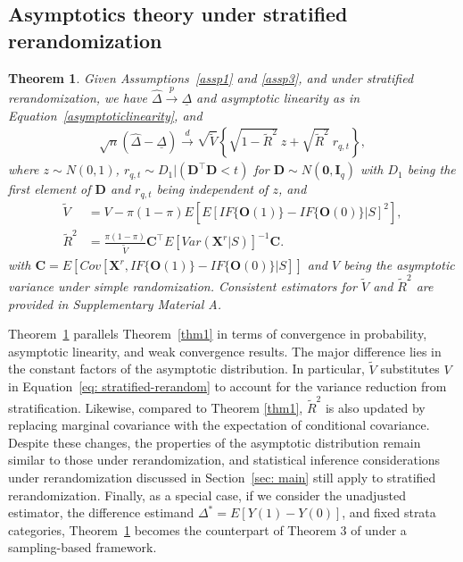 \documentclass[12pt]{article}
\newtheorem{theorem}{Theorem}
\newcommand{\bX}{\boldsymbol{X}}\newcommand{\bO}{\boldsymbol{O}}
\newcommand{\bD}{\boldsymbol{D}}
\newcommand{\bzero}{\boldsymbol{0}}
\begin{document}
{\subsection{Asymptotics theory under stratified rerandomization}
\begin{theorem}\label{thm3}
    Given Assumptions~\ref{assp1} and \ref{assp3}, and under stratified rerandomization, we have $\widehat{\Delta} \xrightarrow{p} \underline{\Delta}$ and asymptotic linearity as in Equation~\eqref{asymptoticlinearity}, and
     \begin{align}\label{eq: stratified-rerandom}
     \sqrt{n}(\widehat{\Delta} - \underline\Delta) \xrightarrow{d} \sqrt{\widetilde{V}}\left\{\sqrt{1-\widetilde{R}^2}\ z + \sqrt{\widetilde{R}^2}\ r_{q,t} \right\},
 \end{align}
 where  $z \sim N(0,1)$, $r_{q,t} \sim D_1|( \bD^\top  \bD < t)$ for $\bD \sim N(\bzero, \mathbf{I}_q)$ with $D_1$ being the first element of $\bD$ and $r_{q,t}$ being independent of $z$, and
     \begin{align*}
        \widetilde{V} &= V - \pi(1-\pi) E\left[E[IF\{\bO(1)\}- IF\{\bO(0)\}|S]^2\right], \\
         \widetilde{R}^2 &= \frac{\pi(1-\pi)}{\widetilde{V}} \boldsymbol{C}^\top E[Var(\bX^r|S)]^{-1}\boldsymbol{C}.
    \end{align*}
with $\boldsymbol{C} = E[Cov[\bX^r, IF\{\bO(1)\}- IF\{\bO(0)\}|S]]$ and $V$ being the asymptotic variance under simple randomization. Consistent estimators for $\widetilde{V}$ and $\widetilde{R}^2$ are provided in Supplementary Material A.
\end{theorem}

Theorem~\ref{thm3} parallels Theorem~\ref{thm1} in terms of convergence in probability, asymptotic linearity, and weak convergence results. The major difference lies in the constant factors of the asymptotic distribution. In particular, $\widetilde{V}$ substitutes $V$ in Equation~\eqref{eq: stratified-rerandom} to 
account for the variance reduction from stratification. Likewise, compared to Theorem \ref{thm1}, $\widetilde{R}^2$ is also updated by replacing marginal covariance with the expectation of conditional covariance. Despite these changes, the properties of the asymptotic distribution remain similar to those under rerandomization, and statistical inference considerations under rerandomization discussed in Section~\ref{sec: main} still apply to stratified rerandomization. Finally, as a special case, if we consider the unadjusted estimator, the difference estimand $\Delta^*=E[Y(1)-Y(0)]$, and fixed strata categories, Theorem~\ref{thm3} becomes the counterpart of Theorem 3 of \cite{wang2023rerandomization} under a sampling-based framework. %

}
\end{document}
